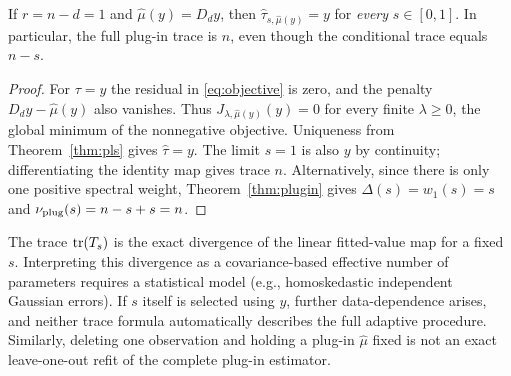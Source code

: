 \begin{corollary}\label{cor:plugin-r1}
If $r=n-d=1$ and $\widehat\mu(y)=D_dy$, then
$\widehat\tau_{s,\widehat\mu(y)}=y$ for \emph{every}
$s\in[0,1]$. In particular, the full plug-in trace
is $n$, even though the conditional trace equals $n-s$.
\end{corollary}
\begin{proof}
For $\tau=y$ the residual in \eqref{eq:objective} is zero,
and the penalty $D_dy-\widehat\mu(y)$ also vanishes.
Thus $J_{\lambda,\widehat\mu(y)}(y)=0$ for every finite
$\lambda\ge0$, the global minimum of the nonnegative
objective. Uniqueness from Theorem~\ref{thm:pls}
gives $\widehat\tau=y$. The limit $s=1$ is also $y$
by continuity; differentiating the identity map gives trace $n$.
Alternatively, since there is only one positive spectral
weight, Theorem~\ref{thm:plugin} gives
$\Delta(s)=w_1(s)=s$ and
$\nu_{\rm plug}(s)=n-s+s=n$.
\end{proof}

\begin{remark}
The trace $\operatorname{tr}(T_s)$ is the exact divergence of the
linear fitted-value map for a fixed $s$.
Interpreting this divergence as a covariance-based
effective number of parameters requires a statistical model
(e.g., homoskedastic independent Gaussian errors).
If $s$ itself is selected using $y$, further
data-dependence arises, and neither trace formula
automatically describes the full adaptive procedure.
Similarly, deleting one observation and holding a
plug-in $\widehat\mu$ fixed is not an exact leave-one-out
refit of the complete plug-in estimator.
\end{remark}
